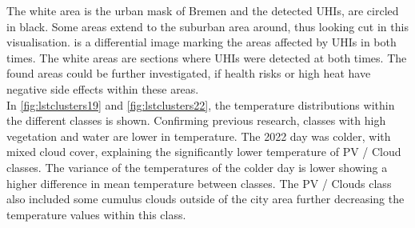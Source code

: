 \documentclass[12pt,a4paper, english,twoside]{scrartcl}
\begin{document}
   \noindent
   The white area is the urban mask of Bremen and the detected \glspl{UHI}, are circled in black. 
   Some areas extend to the suburban area around, thus looking cut in this visualisation.
    is a differential image marking the areas affected by \glspl{UHI} in both times. 
   The white areas are sections where \glspl{UHI} were detected at both times. 
   The found areas could be further investigated, if health risks or high heat have negative side effects within these areas.\\
      \noindent
      In \cref{fig:lstclusters19} and \cref{fig:lstclusters22}, the temperature distributions within the different classes is shown. 
      Confirming previous research, classes with high vegetation and water are lower in temperature. 
      The 2022 day was colder, with mixed cloud cover, explaining the significantly lower temperature of PV / Cloud classes.
      The variance of the temperatures of the colder day is lower showing a higher difference in mean temperature between classes.
      The PV / Clouds class also included some cumulus clouds outside of the city area further decreasing the temperature values within this class. 
\end{document}

